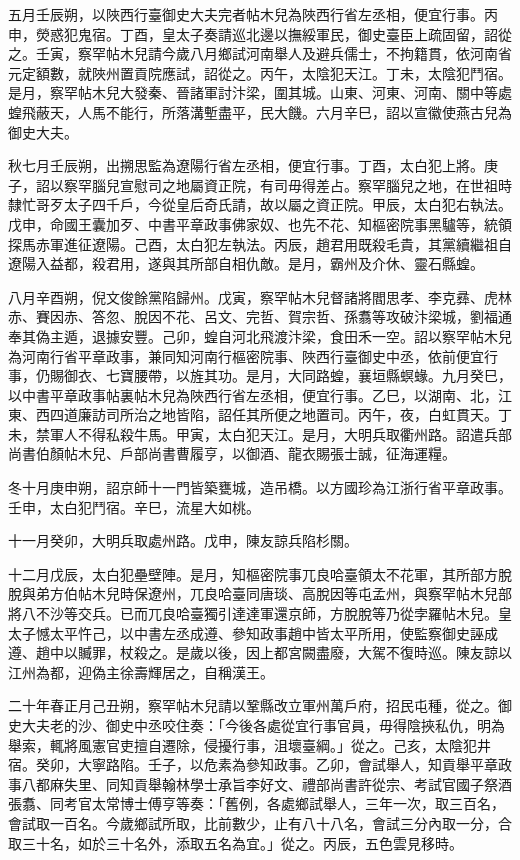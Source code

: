 \begin{pinyinscope}
 五月壬辰朔，以陜西行臺御史大夫完者帖木兒為陜西行省左丞相，便宜行事。丙申，熒惑犯鬼宿。丁酉，皇太子奏請巡北邊以撫綏軍民，御史臺臣上疏固留，詔從之。壬寅，察罕帖木兒請今歲八月鄉試河南舉人及避兵儒士，不拘籍貫，依河南省元定額數，就陜州置貢院應試，詔從之。丙午，太陰犯天江。丁未，太陰犯鬥宿。是月，察罕帖木兒大發秦、晉諸軍討汴梁，圍其城。山東、河東、河南、關中等處蝗飛蔽天，人馬不能行，所落溝塹盡平，民大饑。六月辛巳，詔以宣徽使燕古兒為御史大夫。



 秋七月壬辰朔，出搠思監為遼陽行省左丞相，便宜行事。丁酉，太白犯上將。庚子，詔以察罕腦兒宣慰司之地屬資正院，有司毋得差占。察罕腦兒之地，在世祖時隸忙哥歹太子四千戶，今從皇后奇氏請，故以屬之資正院。甲辰，太白犯右執法。戊申，命國王囊加歹、中書平章政事佛家奴、也先不花、知樞密院事黑驢等，統領探馬赤軍進征遼陽。己酉，太白犯左執法。丙辰，趙君用既殺毛貴，其黨續繼祖自遼陽入益都，殺君用，遂與其所部自相仇敵。是月，霸州及介休、靈石縣蝗。



 八月辛酉朔，倪文俊餘黨陷歸州。戊寅，察罕帖木兒督諸將閻思孝、李克彞、虎林赤、賽因赤、答忽、脫因不花、呂文、完哲、賀宗哲、孫翥等攻破汴梁城，劉福通奉其偽主遁，退據安豐。己卯，蝗自河北飛渡汴梁，食田禾一空。詔以察罕帖木兒為河南行省平章政事，兼同知河南行樞密院事、陜西行臺御史中丞，依前便宜行事，仍賜御衣、七寶腰帶，以旌其功。是月，大同路蝗，襄垣縣螟蝝。九月癸巳，以中書平章政事帖裏帖木兒為陜西行省左丞相，便宜行事。乙巳，以湖南、北，江東、西四道廉訪司所治之地皆陷，詔任其所便之地置司。丙午，夜，白虹貫天。丁未，禁軍人不得私殺牛馬。甲寅，太白犯天江。是月，大明兵取衢州路。詔遣兵部尚書伯顏帖木兒、戶部尚書曹履亨，以御酒、龍衣賜張士誠，征海運糧。



 冬十月庚申朔，詔京師十一門皆築甕城，造吊橋。以方國珍為江浙行省平章政事。壬申，太白犯鬥宿。辛巳，流星大如桃。



 十一月癸卯，大明兵取處州路。戊申，陳友諒兵陷杉關。



 十二月戊辰，太白犯壘壁陣。是月，知樞密院事兀良哈臺領太不花軍，其所部方脫脫與弟方伯帖木兒時保遼州，兀良哈臺同唐琰、高脫因等屯孟州，與察罕帖木兒部將八不沙等交兵。已而兀良哈臺獨引達達軍還京師，方脫脫等乃從孛羅帖木兒。皇太子憾太平忤己，以中書左丞成遵、參知政事趙中皆太平所用，使監察御史誣成遵、趙中以贓罪，杖殺之。是歲以後，因上都宮闕盡廢，大駕不復時巡。陳友諒以江州為都，迎偽主徐壽輝居之，自稱漢王。



 二十年春正月己丑朔，察罕帖木兒請以鞏縣改立軍州萬戶府，招民屯種，從之。御史大夫老的沙、御史中丞咬住奏：「今後各處從宜行事官員，毋得陰挾私仇，明為舉索，輒將風憲官吏擅自遷除，侵擾行事，沮壞臺綱。」從之。己亥，太陰犯井宿。癸卯，大寧路陷。壬子，以危素為參知政事。乙卯，會試舉人，知貢舉平章政事八都麻失里、同知貢舉翰林學士承旨李好文、禮部尚書許從宗、考試官國子祭酒張翥、同考官太常博士傅亨等奏：「舊例，各處鄉試舉人，三年一次，取三百名，會試取一百名。今歲鄉試所取，比前數少，止有八十八名，會試三分內取一分，合取三十名，如於三十名外，添取五名為宜。」從之。丙辰，五色雲見移時。




\end{pinyinscope}
